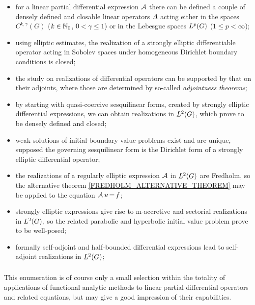 \documentclass[11pt,twoside]{article}
\def\G{G}
\begin{document}
\begin{itemize}[leftmargin=2mm,itemsep=4pt]
\item[-] 
for a linear partial differential expression ${\mathcal{A}}$
there can be defined a couple of densely defined and closable linear operators
$\mathit{A}$ acting either in the {\HOELDER} spaces $C^{k,\gamma}(\G)$
($k \in {\mathbb{N}}_0$, $0 < \gamma \leq 1$)
or in the Lebesgue spaces $\Lp$ ($1 \leq p < \infty$);

\item[-] 
using elliptic estimates,
the realization of a strongly elliptic differentiable operator
acting in Sobolev spaces
under homogeneous Dirichlet boundary conditions is closed;

\item[-] 
the study on realizations of differential operators can be supported
by that on their adjoints,
where those are determined by so-called \textit{adjointness theorems};

\item[-] 
by starting with quasi-coercive sesquilinear forms,
created by strongly elliptic differential expressions,
we can obtain realizations in $\Lh$,
which prove to be densely defined and closed;

\item[-] 
weak solutions of initial-boundary value problems exist and are unique,
supposed the governing sesquilinear form is the Dirichlet form
of a strongly elliptic differential operator;

\item[-] 
the realizations of a regularly elliptic expression ${\mathcal{A}}$ in $\Lh$ are Fredholm,
so the alternative theorem \eqref{FREDHOLM_ALTERNATIVE_THEOREM}
may be applied to the equation ${\mathcal{A}} \, u {\,=\,} f$;

\item[-] 
strongly elliptic expressions give rise to m-accretive and 
sectorial realizations in $\Lh$,
so the related parabolic and hyperbolic initial value problem
prove to be well-posed;

\item[-] 
formally self-adjoint and half-bounded differential expressions
lead to self-adjoint realizations in $\Lh$;
\end{itemize}

\subparagraph{}
This enumeration is of course only a small selection 
within the totality of applications of functional analytic methods
to linear partial differential operators and related equations,
but may give a good impression of their capabilities.
\end{document}
